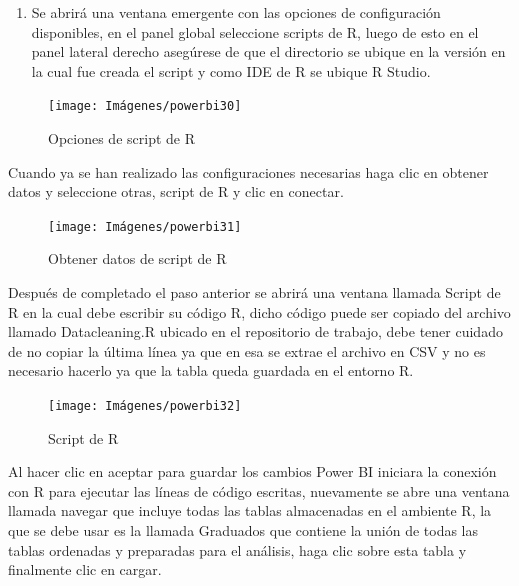 \documentclass[
]{book}
\providecommand{\tightlist}{%
  \setlength{\itemsep}{0pt}\setlength{\parskip}{0pt}}
\begin{document}
\begin{enumerate}
\def\labelenumi{\arabic{enumi}.}
\setcounter{enumi}{1}
\tightlist
\item
  Se abrirá una ventana emergente con las opciones de configuración disponibles, en el panel global seleccione scripts de R, luego de esto en el panel lateral derecho asegúrese de que el directorio se ubique en la versión en la cual fue creada el script y como IDE de R se ubique R Studio.
\end{enumerate}

\begin{figure}

{\centering \texttt{[image: Imágenes/powerbi30]} 

}

\caption{Opciones de script de R}\label{fig:opcionesyconfiguracionR-fig}
\end{figure}

Cuando ya se han realizado las configuraciones necesarias haga clic en obtener datos y seleccione otras, script de R y clic en conectar.

\begin{figure}

{\centering \texttt{[image: Imágenes/powerbi31]} 

}

\caption{Obtener datos de script de R}\label{fig:obtenerdatosR-fig}
\end{figure}

Después de completado el paso anterior se abrirá una ventana llamada Script de R en la cual debe escribir su código R, dicho código puede ser copiado del archivo llamado Datacleaning.R ubicado en el repositorio de trabajo, debe tener cuidado de no copiar la última línea ya que en esa se extrae el archivo en CSV y no es necesario hacerlo ya que la tabla queda guardada en el entorno R.

\begin{figure}

{\centering \texttt{[image: Imágenes/powerbi32]} 

}

\caption{Script de R}\label{fig:scriptdeR-fig}
\end{figure}

Al hacer clic en aceptar para guardar los cambios Power BI iniciara la conexión con R para ejecutar las líneas de código escritas, nuevamente se abre una ventana llamada navegar que incluye todas las tablas almacenadas en el ambiente R, la que se debe usar es la llamada Graduados que contiene la unión de todas las tablas ordenadas y preparadas para el análisis, haga clic sobre esta tabla y finalmente clic en cargar.
\end{document}
